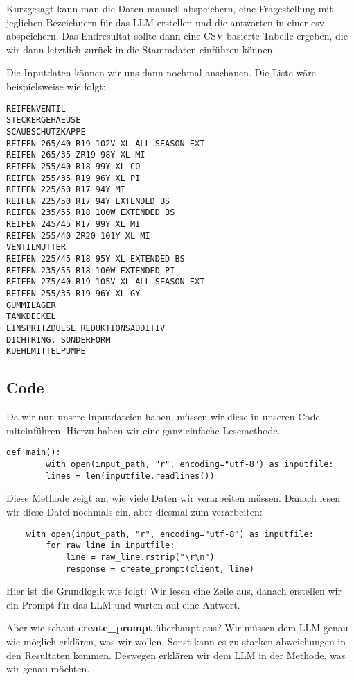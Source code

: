 Kurzgesagt kann man die Daten manuell abspeichern, eine Fragestellung mit jeglichen
Bezeichnern für das LLM erstellen und die antworten in einer csv abspeichern.
Das Endresultat sollte dann eine CSV basierte Tabelle ergeben, die wir dann
letztlich zurück in die Stammdaten einführen können.

Die Inputdaten können wir uns dann nochmal anschauen. Die Liste wäre beispielsweise wie folgt:

\begin{lstlisting}
REIFENVENTIL
STECKERGEHAEUSE
SCAUBSCHUTZKAPPE
REIFEN 265/40 R19 102V XL ALL SEASON EXT
REIFEN 265/35 ZR19 98Y XL MI
REIFEN 255/40 R18 99Y XL CO
REIFEN 255/35 R19 96Y XL PI
REIFEN 225/50 R17 94Y MI
REIFEN 225/50 R17 94Y EXTENDED BS
REIFEN 235/55 R18 100W EXTENDED BS
REIFEN 245/45 R17 99Y XL MI
REIFEN 255/40 ZR20 101Y XL MI
VENTILMUTTER
REIFEN 225/45 R18 95Y XL EXTENDED BS
REIFEN 235/55 R18 100W EXTENDED PI
REIFEN 275/40 R19 105V XL ALL SEASON EXT
REIFEN 255/35 R19 96Y XL GY
GUMMILAGER
TANKDECKEL
EINSPRITZDUESE REDUKTIONSADDITIV
DICHTRING. SONDERFORM
KUEHLMITTELPUMPE
\end{lstlisting}

\subsection{Code}

Da wir nun unsere Inputdateien haben, müssen wir diese in unseren Code miteinführen.
Hierzu haben wir eine ganz einfache Lesemethode.

\begin{lstlisting}
def main():
        with open(input_path, "r", encoding="utf-8") as inputfile:
        lines = len(inputfile.readlines())
\end{lstlisting}

Diese Methode zeigt an, wie viele Daten wir verarbeiten müssen.
Danach lesen wir diese Datei nochmals ein, aber diesmal zum verarbeiten:

\begin{lstlisting}
    with open(input_path, "r", encoding="utf-8") as inputfile:
        for raw_line in inputfile:
            line = raw_line.rstrip("\r\n")
            response = create_prompt(client, line)
\end{lstlisting}

Hier ist die Grundlogik wie folgt: Wir lesen eine Zeile aus,
danach erstellen wir ein Prompt für das LLM und warten auf eine Antwort.

Aber wie schaut \textbf{create_prompt} überhaupt aus?
Wir müssen dem LLM genau wie möglich erklären, was wir wollen.
Sonst kann es zu starken abweichungen in den Resultaten kommen.
Deswegen erklären wir dem LLM in der Methode, was wir genau möchten.

